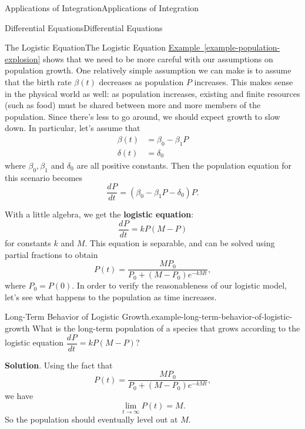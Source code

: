\documentclass[10pt,]{book}
\newcommand{\terminology}[1]{\textbf{#1}}
\numberwithin{equation}{section}
\newcommand{\dv}[3][]{\dfrac{d^{#1} #2}{d #3^{#1}}}
\begin{document}
\begin{chapterptx}{Applications of Integration}{}{Applications of Integration}{}{}
\begin{sectionptx}{Differential Equations}{}{Differential Equations}{}{}
\begin{subsectionptx}{The Logistic Equation}{}{The Logistic Equation}{}{}
\hypertarget{p-743}{}%
\hyperref[example-population-explosion]{Example~\ref{example-population-explosion}} shows that we need to be more careful with our assumptions on population growth. One relatively simple assumption we can make is to assume that the birth rate \(\beta(t)\) decreases as population \(P\) increases. This makes sense in the physical world as well: as population increases, existing and finite resources (such as food) must be shared between more and more members of the population. Since there's less to go around, we should expect growth to slow down. In particular, let's assume that%
\begin{align*}
\beta(t) & = \beta_{0} - \beta_{1}P \\
\delta(t) & = \delta_{0} 
\end{align*}
where \(\beta_{0},\beta_{1}\) and \(\delta_{0}\) are all positive constants. Then the population equation for this scenario becomes%
\begin{equation*}
\dv{P}{t} = (\beta_{0} - \beta_{1}P - \delta_{0})P.
\end{equation*}
%
\par
\hypertarget{p-744}{}%
With a little algebra, we get the \terminology{logistic equation}:%
\begin{equation*}
\dv{P}{t} = kP(M-P)
\end{equation*}
for constants \(k\) and \(M\). This equation is separable, and can be solved using partial fractions to obtain%
\begin{equation*}
P(t) = \frac{MP_{0}}{P_{0} + (M - P_{0})e^{-kMt}},
\end{equation*}
where \(P_{0} = P(0)\). In order to verify the reasonableness of our logistic model, let's see what happens to the population as time increases.%
\begin{example}{Long-Term Behavior of Logistic Growth.}{example-long-term-behavior-of-logistic-growth}%
\hypertarget{p-745}{}%
What is the long-term population of a species that grows according to the logistic equation \(\dv{P}{t} = kP(M-P)\)?%
\par\smallskip%
\noindent\textbf{Solution}.\hypertarget{solution-156}{}\quad%
\hypertarget{p-746}{}%
Using the fact that%
\begin{equation*}
P(t) = \frac{MP_{0}}{P_{0} + (M - P_{0})e^{-kMt}},
\end{equation*}
we have%
\begin{equation*}
\lim_{t\to\infty}P(t) = M.
\end{equation*}
So the population should eventually level out at \(M\).%

\end{example}
\end{subsectionptx}
\end{sectionptx}
\end{chapterptx}
\end{document}
